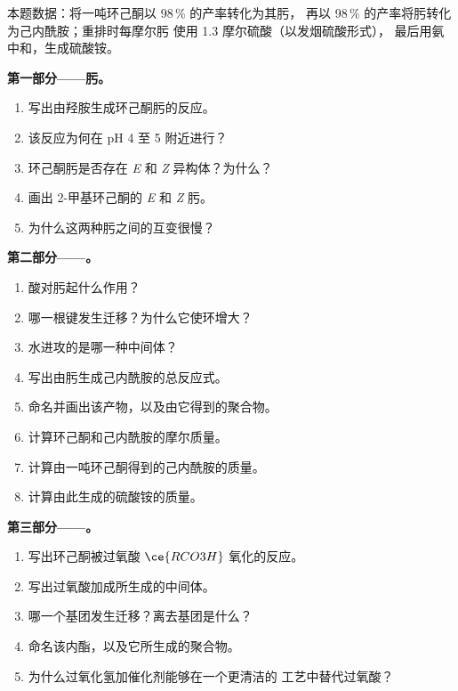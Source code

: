 \begin{problem}
\label{pb:b3:radicals-carbenes:1}
本题数据：将一吨环己酮以 98\,\% 的产率转化为其肟，
再以 98\,\% 的产率将肟转化为己内酰胺；重排时每摩尔肟
使用 1.3 摩尔硫酸（以发烟硫酸形式），
最后用氨中和，生成硫酸铵。

\medskip\noindent\textbf{第一部分——肟。}
\begin{enumerate}
  \item 写出由羟胺生成环己酮肟的反应。
  \item 该反应为何在 pH 4 至 5 附近进行？
  \item 环己酮肟是否存在 \textit{E} 和 \textit{Z} 异构体？为什么？
  \item 画出 2-甲基环己酮的 \textit{E} 和 \textit{Z} 肟。
  \item 为什么这两种肟之间的互变很慢？
\end{enumerate}

\medskip\noindent\textbf{第二部分——。}
\begin{enumerate}[resume]
  \item 酸对肟起什么作用？
  \item 哪一根键发生迁移？为什么它使环增大？
  \item 水进攻的是哪一种中间体？
  \item 写出由肟生成己内酰胺的总反应式。
  \item 命名并画出该产物，以及由它得到的聚合物。
  \item 计算环己酮和己内酰胺的摩尔质量。
  \item 计算由一吨环己酮得到的己内酰胺的质量。
  \item 计算由此生成的硫酸铵的质量。
\end{enumerate}

\medskip\noindent\textbf{第三部分——。}
\begin{enumerate}[resume]
  \item 写出环己酮被过氧酸 $\ce{RCO3H}$ 氧化的反应。
  \item 写出过氧酸加成所生成的中间体。
  \item 哪一个基团发生迁移？离去基团是什么？
  \item 命名该内酯，以及它所生成的聚合物。
  \item 为什么过氧化氢加催化剂能够在一个更清洁的
        工艺中替代过氧酸？
\end{enumerate}


\end{problem}
